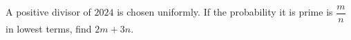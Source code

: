 A positive divisor of $ 2024 $ is chosen uniformly. If the probability it is prime is $\dfrac{m}{n}$ in lowest terms, find $ 2m+3n $.

